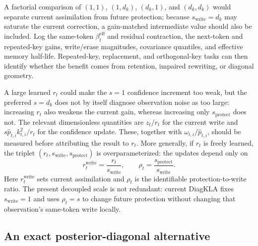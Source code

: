 \documentclass[11pt]{article}
\begin{document}
A factorial comparison of $(1,1)$, $(1,d_k)$,
$(d_k,1)$, and $(d_k,d_k)$ would separate current assimilation from future protection; because
$s_{\mathrm{write}}=d_k$ may saturate the current correction, a gain-matched intermediate value
should also be included. Log the same-token $\beta_t^{\mathrm{eff}}$ and residual contraction,
the next-token and repeated-key gains, write/erase magnitudes, covariance quantiles, and effective
memory half-life. Repeated-key, replacement, and orthogonal-key tasks can then identify whether
the benefit comes from retention, impaired rewriting, or diagonal geometry.

A large learned $r_t$ could make the $s=1$ confidence increment too weak, but the preferred
$s=d_k$ does not by itself diagnose observation noise as too large: increasing $r_t$ also weakens
the current gain, whereas increasing only $s_{\mathrm{protect}}$ does not. The relevant
dimensionless quantities are $z_t/r_t$ for the current write and
$s\widehat p_{t,i}k_{t,i}^2/r_t$ for the confidence update. These, together with
$\omega_{t,i}/\widehat p_{t,i}$, should be measured before attributing the result to $r_t$.
More generally, if $r_t$ is freely learned, the triplet
$(r_t,s_{\mathrm{write}},s_{\mathrm{protect}})$ is overparameterized: the updates depend only on
\begin{equation}
  r_t^{\mathrm{write}}=\frac{r_t}{s_{\mathrm{write}}},
  \qquad
  \rho_t=\frac{s_{\mathrm{protect}}}{s_{\mathrm{write}}}.
  \label{eq:discussion-write-protect-identifiable-parameters}
\end{equation}
Here $r_t^{\mathrm{write}}$ sets current assimilation and $\rho_t$ is the identifiable
protection-to-write ratio. The present decoupled scale is not redundant: current DiagKLA fixes
$s_{\mathrm{write}}=1$ and uses $\rho_t=s$ to change future protection without changing that
observation's same-token write locally.

\subsection{An exact posterior-diagonal alternative}
\end{document}
